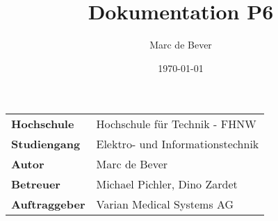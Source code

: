 \documentclass[final]{fhnwreport}       %
\title{Dokumentation P6}          %
\author{Marc de Bever}          %
\date{\today}             %
\begin{document}
\maketitle

\vspace*{-1cm}						    %
\vfill
\begin{figure}[H]
\centering
\end{figure}
\vfill

{
\renewcommand\arraystretch{2}
\begin{center}
\begin{tabular}{>{\bf}p{4cm} l}
Hochschule                 &    Hochschule für Technik - FHNW\\
Studiengang                &    Elektro- und Informationstechnik\\
Autor   		           & 	Marc de Bever\\
Betreuer                   &    Michael Pichler, Dino Zardet\\
Auftraggeber               &    Varian Medical Systems AG\\
\end{tabular}
\end{center}
}

\clearpage
			
\thispagestyle{empty}


\tableofcontents
\clearpage


\clearpage

\clearpage

\clearpage

\clearpage

\clearpage

\clearpage



{\sloppypar
\printbibliography[heading=bibintoc]
\label{sec:lit}
}


\end{document}
